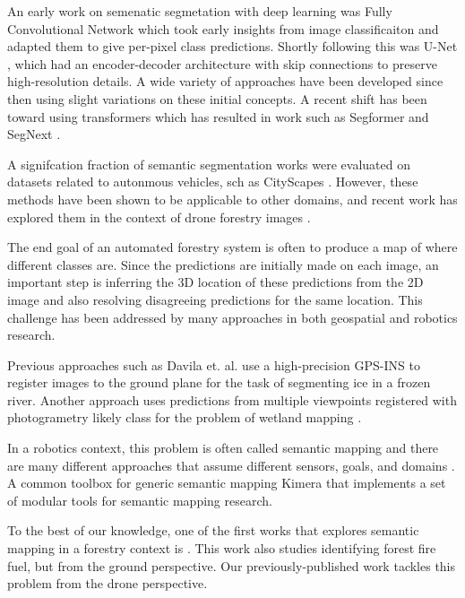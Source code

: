 An early work on semenatic segmetation with deep learning was Fully Convolutional Network \cite{Shelhamer2017FullySegmentation} which took early insights from image classificaiton and adapted them to give per-pixel class predictions. Shortly following this was U-Net \cite{RonnebergerUNET2015}, which had an encoder-decoder architecture with skip connections to preserve high-resolution details. A wide variety of approaches have been developed since then using slight variations on these initial concepts. A recent shift has been toward using transformers \cite{Vaswani2017AttentionNeed} which has resulted in work such as Segformer \cite{Xie2021} and SegNext \cite{Guo2022SegNeXt:Segmentation}.

A signifcation fraction of semantic segmentation works were evaluated on datasets related to autonmous vehicles, sch as CityScapes \cite{Cordts2016}. However, these methods have been shown to be applicable to other domains, and recent work has explored them in the context of drone forestry images \cite{Nogueira2017SemanticConvNets, Neves2020SemanticU-net}. 

The end goal of an automated forestry system is often to produce a map of where different classes are. Since the predictions are initially made on each image, an important step is inferring the 3D location of these predictions from the 2D image and also resolving disagreeing predictions for the same location. This challenge has been addressed by many approaches in both geospatial and robotics research. 

Previous approaches such as Davila et. al. use a high-precision GPS-INS to register images \cite{Davila2022ADAPT:AI} to the ground plane for the task of segmenting ice in a frozen river. 
Another approach uses predictions from multiple viewpoints registered with photogrametry likely class for the problem of wetland mapping 
\cite{Liu2018DeepClassification}.

In a robotics context, this problem is often called semantic mapping and there are many different approaches that assume different sensors, goals, and domains \cite{Kostavelis2015SemanticSurvey}.
A common toolbox for generic semantic mapping Kimera \cite{Rosinol2020} that implements a set of modular tools for semantic mapping research. 

To the best of our knowledge, one of the first works that explores semantic mapping in a forestry context is \cite{Andrada2022IntegrationRoboticsb}. This work also studies identifying forest fire fuel, but from the ground perspective. Our previously-published work \cite{RussellUnmannedMitigation} tackles this problem from the drone perspective.




